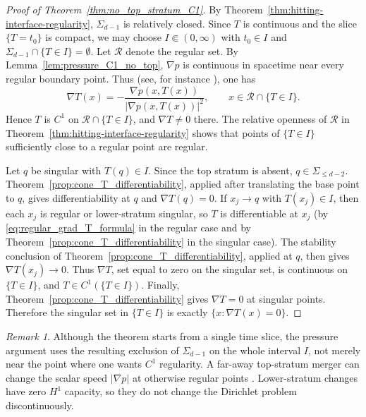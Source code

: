 \documentclass[11pt]{amsart}
\numberwithin{equation}{section}
\numberwithin{figure}{section}
\theoremstyle{plain}
\theoremstyle{definition}
\theoremstyle{remark}
\newtheorem{rem}[thm]{Remark}
\theoremstyle{plain}
\begin{document}
\begin{proof}[Proof of Theorem~\ref{thm:no_top_stratum_C1}]
By Theorem~\ref{thm:hitting-interface-regularity}, \(\Sigma_{d-1}\) is
relatively closed.  Since \(T\) is continuous and the slice \(\{T=t_0\}\) is
compact, we may choose \(I\Subset(0,\infty)\) with \(t_0\in I\) and
\(\Sigma_{d-1}\cap\{T\in I\}=\emptyset\).
Let $\mathcal R$ denote the regular set. By Lemma~\ref{lem:pressure_C1_no_top}, $\nabla p$ is continuous in spacetime near every regular boundary point. Thus (see, for instance \cite[Lem.~5.18]{CJK25}), one has
\begin{equation}\label{eq:regular_grad_T_formula}
    \nabla T(x)=-\frac{\nabla p(x,T(x))}{|\nabla p(x,T(x))|^2},
    \qquad x\in\mathcal R\cap\{T\in I\}.
\end{equation}
Hence $T$ is $C^1$ on $\mathcal R\cap\{T\in I\}$, and $\nabla T\neq0$ there.
The relative openness of \(\mathcal R\) in
Theorem~\ref{thm:hitting-interface-regularity} shows that points of $\{T\in I\}$ sufficiently close to a regular point are regular.

Let $q$ be singular with $T(q)\in I$. Since the top stratum is absent,
$q\in\Sigma_{\leq d-2}$. Theorem~\ref{prop:cone_T_differentiability},
applied after translating the base point to $q$, gives differentiability at
$q$ and $\nabla T(q)=0$. If $x_j\to q$ with $T(x_j)\in I$, then each $x_j$
is regular or lower-stratum singular, so $T$ is differentiable at $x_j$
(by \eqref{eq:regular_grad_T_formula} in the regular case and by
Theorem~\ref{prop:cone_T_differentiability} in the singular case).
The stability conclusion of
Theorem~\ref{prop:cone_T_differentiability}, applied at $q$, then gives
$\nabla T(x_j)\to0$. Thus $\nabla T$, set equal to
zero on the singular set, is continuous on $\{T\in I\}$, and
$T\in C^1(\{T\in I\})$.
Finally, Theorem~\ref{prop:cone_T_differentiability} gives $\nabla T=0$
at singular points. Therefore the singular set in $\{T\in I\}$ is exactly
$\{x:\nabla T(x)=0\}$.
\end{proof}

\begin{rem}
Although the theorem starts from a single time slice, the pressure argument uses the resulting exclusion of $\Sigma_{d-1}$ on the whole interval $I$, not merely near the point where one wants $C^1$ regularity. A far-away top-stratum merger can change the scalar speed $|\nabla p|$ at otherwise regular points \cite[Rem.~5.7]{CJK25}. Lower-stratum changes have zero $H^1$ capacity, so they do not change the Dirichlet problem discontinuously.
\end{rem}
\end{document}
